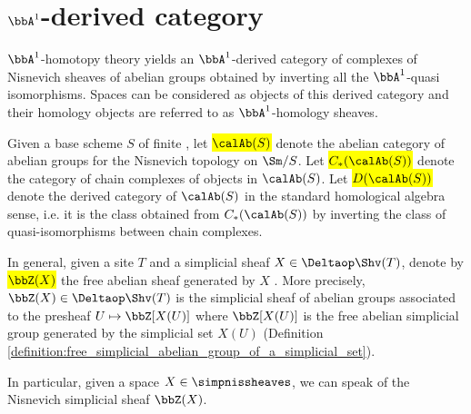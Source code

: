 \section{\texorpdfstring{$\bbA^1$}{A1}-derived category}

$\bbA^1$-homotopy theory yields an $\bbA^1$-derived category of complexes of Nisnevich sheaves of abelian groups obtained by inverting all the $\bbA^1$-quasi isomorphisms. Spaces can be considered as objects of this derived category and their homology objects are referred to as $\bbA^1$-homology sheaves. 

\begin{notation}
    Given a  base scheme $S$ of finite , let \hl{$\calAb(S)$} denote the abelian category of abelian groups for the Nisnevich topology on $\Sm/S$. Let \hl{$C_*(\calAb(S))$} denote the category of chain complexes of objects in $\calAb(S)$. Let \hl{$D(\calAb(S))$} denote the derived category of $\calAb(S)$ in the standard homological algebra sense, i.e. it is the class obtained from $C_*(\calAb(S))$ by inverting the class of quasi-isomorphisms between chain complexes.

    In general, given a site $T$ and a simplicial sheaf $X \in \Deltaop\Shv(T)$, denote by \hl{$\bbZ(X)$} the free abelian sheaf generated by $X$ . More precisely, $\bbZ(X) \in \Deltaop\Shv(T)$ is the simplicial sheaf of abelian groups associated to the presheaf $U \mapsto \bbZ[X(U)]$ where $\bbZ[X(U)]$ is the free abelian simplicial group generated by the simplicial set $X(U)$ (Definition \ref{definition:free_simplicial_abelian_group_of_a_simplicial_set}). 
\end{notation}


In particular, given a space $X \in \simpnissheaves$, we can speak of the Nisnevich simplicial sheaf $\bbZ(X)$.

